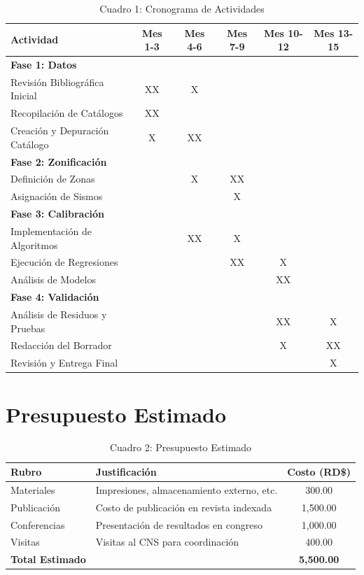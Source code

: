 \documentclass[12pt,a4paper]{article}
\begin{document}
\begin{table}[H]
\centering
\small
\shorthandoff{>}
\begin{tabular}{|l|c|c|c|c|c|}
\hline
\textbf{Actividad} & \textbf{Mes 1-3} & \textbf{Mes 4-6} & \textbf{Mes 7-9} & \textbf{Mes 10-12} & \textbf{Mes 13-15} \\ \hline
\textbf{Fase 1: Datos} & & & & & \\
Revisión Bibliográfica Inicial & XX & X & & & \\
Recopilación de Catálogos & XX & & & & \\
Creación y Depuración Catálogo & X & XX & & & \\ \hline
\textbf{Fase 2: Zonificación} & & & & & \\
Definición de Zonas & & X & XX & & \\
Asignación de Sismos & & & X & & \\ \hline
\textbf{Fase 3: Calibración} & & & & & \\
Implementación de Algoritmos & & XX & X & & \\
Ejecución de Regresiones & & & XX & X & \\
Análisis de Modelos & & & & XX & \\ \hline
\textbf{Fase 4: Validación} & & & & & \\
Análisis de Residuos y Pruebas & & & & XX & X \\
Redacción del Borrador & & & & X & XX \\
Revisión y Entrega Final & & & & & X \\ \hline
\end{tabular}
\shorthandon{>}
\caption{Cuadro 1: Cronograma de Actividades}
\end{table}

\clearpage
\section{Presupuesto Estimado}
\begin{table}[H]
\centering
\small
\begin{tabular}{|l|p{6cm}|c|}
\hline
\textbf{Rubro} & \textbf{Justificación} & \textbf{Costo (RD\$)} \\ \hline
Materiales & Impresiones, almacenamiento externo, etc. & 300.00 \\ \hline
Publicación & Costo de publicación en revista indexada & 1,500.00 \\ \hline
Conferencias & Presentación de resultados en congreso & 1,000.00 \\ \hline
Visitas & Visitas al CNS para coordinación & 400.00 \\ \hline
\textbf{Total Estimado} & & \textbf{5,500.00} \\ \hline
\end{tabular}
\caption{Cuadro 2: Presupuesto Estimado}
\end{table}
\end{document}
